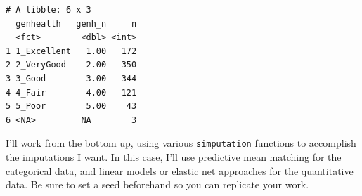 \documentclass[]{book}
\newenvironment{Shaded}{\begin{snugshade}}{\end{snugshade}}
\newcommand{\KeywordTok}[1]{\textcolor[rgb]{0.13,0.29,0.53}{\textbf{#1}}}
\newcommand{\DataTypeTok}[1]{\textcolor[rgb]{0.13,0.29,0.53}{#1}}
\newcommand{\DecValTok}[1]{\textcolor[rgb]{0.00,0.00,0.81}{#1}}
\newcommand{\StringTok}[1]{\textcolor[rgb]{0.31,0.60,0.02}{#1}}
\newcommand{\OperatorTok}[1]{\textcolor[rgb]{0.81,0.36,0.00}{\textbf{#1}}}
\newcommand{\NormalTok}[1]{#1}
\theoremstyle{definition}
\theoremstyle{definition}
\theoremstyle{definition}
\theoremstyle{remark}
\begin{document}
\begin{Shaded}
\end{Shaded}

\begin{verbatim}
# A tibble: 6 x 3
  genhealth   genh_n     n
  <fct>        <dbl> <int>
1 1_Excellent   1.00   172
2 2_VeryGood    2.00   350
3 3_Good        3.00   344
4 4_Fair        4.00   121
5 5_Poor        5.00    43
6 <NA>         NA        3
\end{verbatim}

I'll work from the bottom up, using various \texttt{simputation}
functions to accomplish the imputations I want. In this case, I'll use
predictive mean matching for the categorical data, and linear models or
elastic net approaches for the quantitative data. Be sure to set a seed
beforehand so you can replicate your work.

\begin{Shaded}
\end{Shaded}
\end{document}
